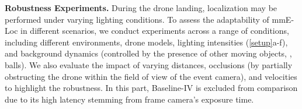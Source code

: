 
{}

\textbf{Robustness Experiments.}
During the drone landing, localization may be performed under varying lighting conditions.
To assess the adaptability of mmE-Loc in different scenarios, we conduct experiments across a range of conditions, including different environments, drone models, lighting intensities (\fig \ref{setup}a-f), and background dynamics (controlled by the presence of other moving objects, \eg, balls). 
We also evaluate the impact of varying distances, occlusions (by partially obstructing the drone within the field of view of the event camera), and velocities to highlight the robustness.
In this part, Baseline-IV is excluded from comparison due to its high latency stemming from frame camera's exposure time.


 
\vspace{-0.4cm}
